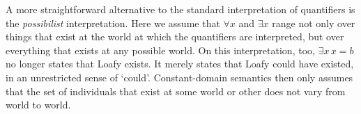 





A more straightforward alternative to the standard interpretation of quantifiers
is the \emph{possibilist} interpretation. Here we assume that $\forall x$ and
$\exists x$ range not only over things that exist at the world at which the
quantifiers are interpreted, but over everything that exists at any possible
world. On this interpretation, too, $\exists x\, x\!=\!b$ no longer states that Loafy
exists. It merely states that Loafy could have existed, in an unrestricted sense
of `could'. Constant-domain semantics then only assumes that the set of
individuals that exist at some world or other does not vary from world to world.

